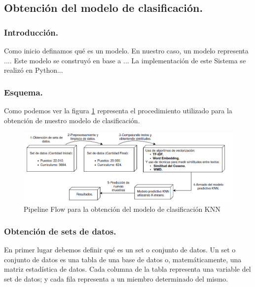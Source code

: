 \documentclass[12pt,a4paper]{article}
\begin{document}
\begin{sloppypar}
\begin{enumerate}
\end{enumerate}

\cleardoublepage

\subsection{Obtención del modelo de clasificación.}\label{5.1.Obtenciondelmodelopredictivo}

\subsubsection{Introducción.}
Como inicio definamos qué es un modelo. En nuestro caso, un modelo representa ....
Este modelo se construyó en base a ...
La implementación de este Sistema se realizó en Python...

\subsubsection{Esquema.}
Como podemos ver la figura \ref{fig:FlowCoreSystem} representa el procedimiento utilizado para la obtención de nuestro modelo de clasificación. 

\begin{figure}[H]    %
  \centering
  \includegraphics[width=1\textwidth]{images/flow-core.png} 	%
  \caption{Pipeline Flow para la obtención del modelo de clasificación KNN}  
  \label{fig:FlowCoreSystem}
\end{figure}

\cleardoublepage

\subsubsection{Obtención de sets de datos.}\label{obtencion_set_datos}
En primer lugar debemos definir qué es un set o conjunto de datos.
Un set o conjunto de datos es una tabla de una base de datos o, matemáticamente, una matriz estadística de datos. Cada columna de la tabla representa una variable del set de datos; y cada fila representa a un miembro determinado del mismo.


\end{sloppypar}
\end{document}
